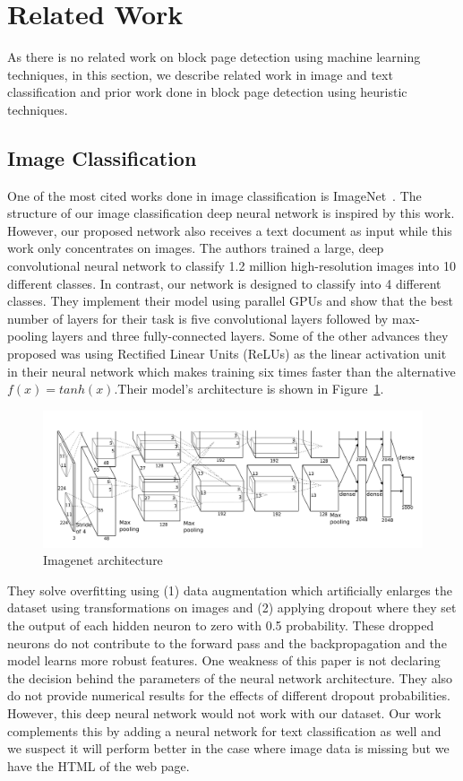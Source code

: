 \documentclass{article} %
\begin{document}
\section{Related Work}
As there is no related work on block page detection using machine learning techniques, in this section, we describe related work in image and text classification and prior work done in block page detection using heuristic techniques.

\subsection{Image Classification}
One of the most cited works done in image classification is ImageNet~\cite{imagehinton}. The structure of our image classification deep neural network is inspired by this work. However, our proposed network also receives a text document as input while this work only concentrates on images.
The authors trained a large, deep convolutional neural network to classify 1.2 million high-resolution images into 10 different classes. In contrast, our network is designed to classify into 4 different classes.
They implement their model using parallel GPUs and show that the best number of layers for their task is five convolutional layers followed by max-pooling layers and three fully-connected layers. Some of the other advances they proposed was using Rectified Linear Units (ReLUs) as the linear activation unit in their neural network which makes training six times faster than the alternative $f(x) = tanh(x)$.Their model's architecture is shown in Figure~\ref{fig:imagenet}.
\begin{figure}
\centering
        \includegraphics[totalheight=5cm]{imagenet}
    \caption{Imagenet architecture \protect\cite{imagehinton}}
    \label{fig:imagenet}
\end{figure}
They solve overfitting using (1) data augmentation which artificially enlarges the dataset using transformations on images and (2) applying dropout where they set the output of each hidden neuron to zero with 0.5 probability. These dropped neurons do not contribute to the forward pass and the backpropagation and the model learns more robust features.
One weakness of this paper is not declaring the decision behind the parameters of the neural network architecture. They also do not provide numerical results for the effects of different dropout probabilities. However, this deep neural network would not work with our dataset. Our work complements this by adding a neural network for text classification as well and we suspect it will perform better in the case where image data is missing but we have the HTML of the web page.
\end{document}
